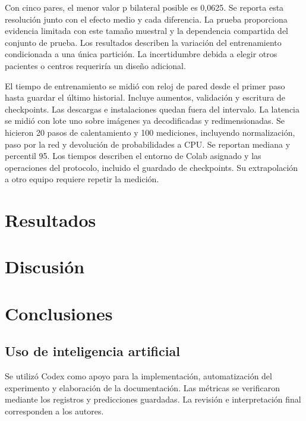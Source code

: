\documentclass[conference]{IEEEtran}
\begin{document}
Con cinco pares, el menor valor p bilateral posible es 0,0625. Se reporta esta resolución junto con el efecto medio y cada diferencia. La prueba proporciona evidencia limitada con este tamaño muestral y la dependencia compartida del conjunto de prueba. Los resultados describen la variación del entrenamiento condicionada a una única partición. La incertidumbre debida a elegir otros pacientes o centros requeriría un diseño adicional.

El tiempo de entrenamiento se midió con reloj de pared desde el primer paso hasta guardar el último historial. Incluye aumentos, validación y escritura de checkpoints. Las descargas e instalaciones quedan fuera del intervalo. La latencia se midió con lote uno sobre imágenes ya decodificadas y redimensionadas. Se hicieron 20 pasos de calentamiento y 100 mediciones, incluyendo normalización, paso por la red y devolución de probabilidades a CPU. Se reportan mediana y percentil 95. Los tiempos describen el entorno de Colab asignado y las operaciones del protocolo, incluido el guardado de checkpoints. Su extrapolación a otro equipo requiere repetir la medición.

\section{Resultados}

\section{Discusión}

\balance
\section{Conclusiones}

\subsection*{Uso de inteligencia artificial}
Se utilizó Codex como apoyo para la implementación, automatización del experimento y elaboración de la documentación. Las métricas se verificaron mediante los registros y predicciones guardadas. La revisión e interpretación final corresponden a los autores.
\clearpage

\end{document}
